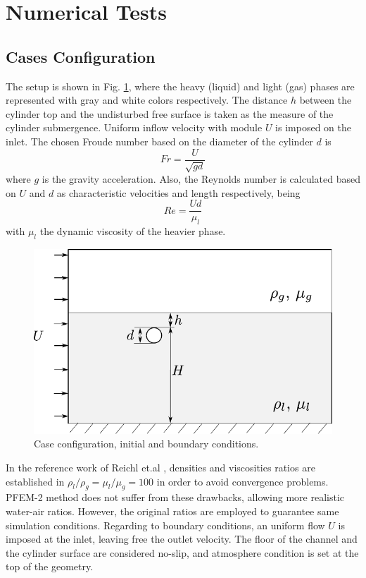 \section{Numerical Tests}

\subsection{Cases Configuration}

The setup is shown in Fig. \ref{fg:config}, where the heavy (liquid) and light (gas) phases are represented with gray and white colors respectively. The distance $h$ between the cylinder top and the undisturbed free surface is taken as the measure of the cylinder submergence. Uniform inflow velocity with module $U$ is imposed on the inlet. The chosen Froude number based on the diameter of the cylinder $d$ is
\begin{equation}
 Fr = \frac{U}{\sqrt{gd}}
\label{eq:froude}
\end{equation}
where $g$ is the gravity acceleration. Also, the Reynolds number is calculated based on $U$ and $d$ as characteristic velocities and length respectively, being
\begin{equation}
 Re = \frac{U d}{\mu_l}
\label{eq:reynolds}
\end{equation}
with $\mu_l$ the dynamic viscosity of the heavier phase.

\begin{figure}[ht]
  \centering
  \includegraphics[width=0.9\columnwidth]{images_10thspheric/config.pdf}
  \caption{Case configuration, initial and boundary conditions.}
  \label{fg:config}
\end{figure}

In the reference work of Reichl et.al \cite{Reichl05}, densities and viscosities ratios are established in $\rho_l/\rho_g = \mu_l/\mu_g=100$ in order to avoid convergence problems. PFEM-2 method does not suffer from these drawbacks, allowing more realistic water-air ratios. However, the original ratios are employed to guarantee same simulation conditions. Regarding to boundary conditions, an uniform flow $U$ is imposed at the inlet, leaving free the outlet velocity. The floor of the channel and the cylinder surface are considered no-slip, and atmosphere condition is set at the top of the geometry.

